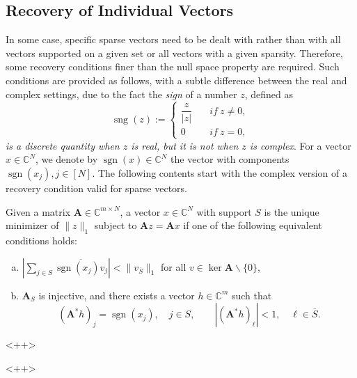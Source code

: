 \subsection{Recovery of Individual Vectors}
In some case, specific sparse vectors need to be dealt with rather than with all vectors supported on a given set or all vectors with a given sparsity. Therefore, some recovery conditions finer than the null space property are required. Such conditions are provided as follows, with a subtle difference between the real and complex settings, due to the fact the \emph{sign} of a number $z$, defined as
\begin{equation*}
    \mathop{\mathrm{sng}}(z) :=
    \left\{ 
        \begin{array}{cc}
            \dfrac{z}{\left|z\right|} \quad & if \ z\neq 0, \\
            0 \quad & if \ z=0,
        \end{array}
    \right.
\end{equation*}
\emph{\textcolor[rgb]{1,0,0}{is a discrete quantity when $z$ is real, but it is not when $z$ is complex}}. For a vector $x \in \mathbb{C}^N$, we denote by $\mathop{\mathrm{sgn}}(x) \in \mathbb{C}^N$ the vector with components $\mathop{\mathrm{sgn}}(x_j), j \in [N]$. The following contents start with the complex version of a recovery condition valid for sparse vectors.

\begin{theorem}
    \label{thm0.4.26}
    Given a matrix $\mathbf{A} \in \mathbb{C}^{m \times N}$, a vector $x \in \mathbb{C}^N$ with support $S$ is the unique minimizer of $\|z\|_1$ subject to $\mathbf{A}z = \mathbf{A}x$ if one of the following equivalent conditions holds:
    \begin{enumerate}[(a)]
        \item $\left|\sum\limits_{j \in S}^{} \overline{\mathop{\mathrm{sgn}}(x_j)v_j}\right| < \|v_{\overline{S}}\|_1$ for all $v \in \mathop{\mathrm{ker}} \mathbf{A} \backslash \{0\}$,
        \item $\mathbf{A}_S$ is injective, and there exists a vector $h \in \mathbb{C}^m$ such that
            \[
                (\mathbf{A}^*h)_j = \mathop{\mathrm{sgn}}(x_j), \quad j \in S, \qquad \left|(\mathbf{A}^*h)_{\ell}\right| < 1, \quad \ell \in \overline{S}.
            \]
    \end{enumerate}<++>
\end{theorem}<++>

